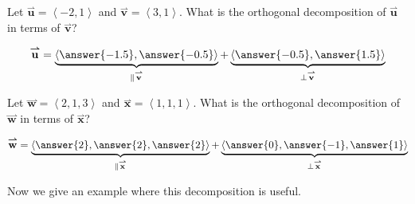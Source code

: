 \documentclass{ximera}
\begin{document}
\begin{question}
Let $\overset{\boldsymbol{\rightharpoonup}}{\mathbf{u}} = \left\langle -2,1 \right\rangle$ and $\overset{\boldsymbol{\rightharpoonup}}{\mathbf{v}} = \left\langle 3,1 \right\rangle$.  What is the
orthogonal decomposition of $\overset{\boldsymbol{\rightharpoonup}}{\mathbf{u}}$ in terms of $\overset{\boldsymbol{\rightharpoonup}}{\mathbf{v}}$?
\begin{prompt}
\[
\overset{\boldsymbol{\rightharpoonup}}{\mathbf{u}}= \underbrace{\left\langle \answer{-1.5},\answer{-0.5}\right\rangle}_{\parallel \overset{\boldsymbol{\rightharpoonup}}{\mathbf{v}}} + \underbrace{\left\langle\answer{-0.5},\answer{1.5}\right\rangle}_{\perp \overset{\boldsymbol{\rightharpoonup}}{\mathbf{v}}}
\]
\end{prompt}
\begin{question}
  Let $\overset{\boldsymbol{\rightharpoonup}}{\mathbf{w}} =\left\langle 2,1,3 \right\rangle$ and $\overset{\boldsymbol{\rightharpoonup}}{\mathbf{x}}  =\left\langle 1,1,1 \right\rangle$. What is the
  orthogonal decomposition of $\overset{\boldsymbol{\rightharpoonup}}{\mathbf{w}}$ in terms of $\overset{\boldsymbol{\rightharpoonup}}{\mathbf{x}}$?
  \begin{prompt}
  \[
  \overset{\boldsymbol{\rightharpoonup}}{\mathbf{w}}  = \underbrace{\left\langle \answer{2},\answer{2},\answer{2}\right\rangle}_{\parallel \overset{\boldsymbol{\rightharpoonup}}{\mathbf{x}}} + \underbrace{\left\langle \answer{0},\answer{-1},\answer{1} \right\rangle}_{\perp\overset{\boldsymbol{\rightharpoonup}}{\mathbf{x}}}
  \]
  \end{prompt}
\end{question}
\end{question}


Now we give an example where this decomposition is useful.
\end{document}
